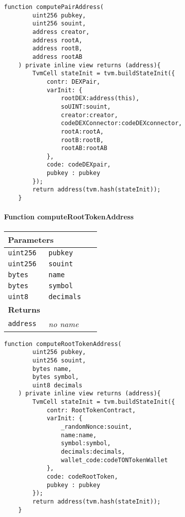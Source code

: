 \vspace{2cm}

\begin{lstlisting}[firstnumber=146]
	function computePairAddress(
		uint256 pubkey,
		uint256 souint,
		address creator,
		address rootA,
		address rootB,
		address rootAB
	) private inline view returns (address){
		TvmCell stateInit = tvm.buildStateInit({
			contr: DEXPair,
			varInit: {
				rootDEX:address(this),
				soUINT:souint,
				creator:creator,
				codeDEXConnector:codeDEXconnector,
				rootA:rootA,
				rootB:rootB,
				rootAB:rootAB
			},
			code: codeDEXpair,
			pubkey : pubkey
		});
		return address(tvm.hash(stateInit));
	}
\end{lstlisting}

\paragraph{Function computeRootTokenAddress}


\ifsoltables
\noindent\begin{tabular}{|l|l|p{5cm}|}\hline
\multicolumn{3}{|l|}{\bf Parameters}\\\hline
\tt uint256 & \tt pubkey &\\\hline
\tt uint256 & \tt souint &\\\hline
\tt bytes & \tt name &\\\hline
\tt bytes & \tt symbol &\\\hline
\tt uint8 & \tt decimals &\\\hline
\multicolumn{3}{|l|}{\bf Returns}\\\hline
\tt address & {\em no name} &\\\hline
\end{tabular}
\fi

\vspace{2cm}

\begin{lstlisting}[firstnumber=182]
	function computeRootTokenAddress(
		uint256 pubkey,
		uint256 souint,
		bytes name,
		bytes symbol,
		uint8 decimals
	) private inline view returns (address){
		TvmCell stateInit = tvm.buildStateInit({
			contr: RootTokenContract,
			varInit: {
				_randomNonce:souint,
				name:name,
				symbol:symbol,
				decimals:decimals,
				wallet_code:codeTONTokenWallet
			},
			code: codeRootToken,
			pubkey : pubkey
		});
		return address(tvm.hash(stateInit));
	}
\end{lstlisting}
